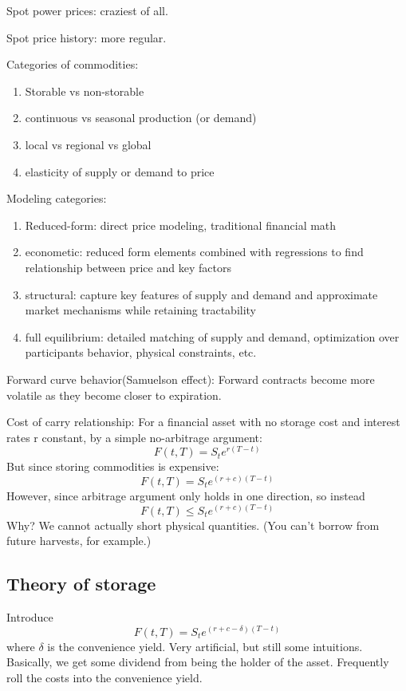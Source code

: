 Spot power prices: craziest of all.

Spot price history: more regular.

Categories of commodities:
\begin{enumerate}
	\item Storable vs non-storable
	\item continuous vs seasonal production (or demand)
	\item local vs regional vs global
	\item elasticity of supply or demand to price
\end{enumerate}

Modeling categories:
\begin{enumerate}
	\item Reduced-form: direct price modeling, traditional financial math
	\item econometic: reduced form elements combined with regressions to find relationship between price and key factors
	\item structural: capture key features of supply and demand and approximate market mechanisms while retaining tractability
	\item full equilibrium: detailed matching of supply and demand, optimization over participants behavior, physical constraints, etc.
\end{enumerate}

Forward curve behavior(Samuelson effect): Forward contracts become more volatile as they become closer to expiration.

Cost of carry relationship:
For a financial asset with no storage cost and interest rates r constant, by a simple no-arbitrage argument:
\begin{equation}
	F(t,T) = S_t e^{r(T-t)}
\end{equation}
But since storing commodities is expensive:
\begin{equation}
	F(t,T) = S_t e^{(r+c)(T-t)}
\end{equation}
However, since arbitrage argument only holds in one direction, so instead
\begin{equation}
	F(t,T) \leq S_t e^{(r+c)(T-t)}
\end{equation}
Why? We cannot actually short physical quantities. (You can't borrow from future harvests, for example.)

\subsection{Theory of storage}
Introduce
\begin{equation}
	F(t,T) = S_t e^{(r+c-\delta)(T-t)}
\end{equation}
where $\delta$ is the convenience yield. Very artificial, but still some intuitions. Basically, we get some dividend from being the holder of the asset. Frequently roll the costs into the convenience yield.

